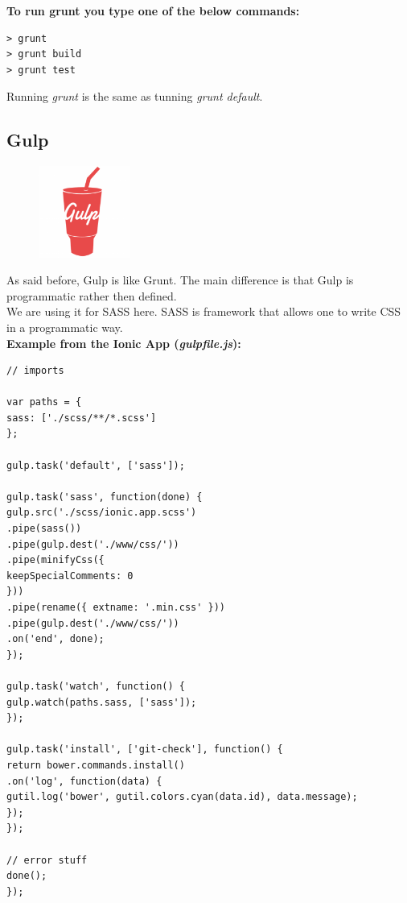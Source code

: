  \textbf{To run grunt you type one of the below commands:}
  \begin{verbatim}
> grunt
> grunt build
> grunt test
  \end{verbatim}
  Running \textit{grunt} is the same as tunning \textit{grunt default}.
 
 \subsection{Gulp}
 \begin{figure}
 	\includegraphics[width=3cm]{img/mobile-app/logos/gulp.png}
 \end{figure} 
As said before, Gulp \cite{gulp} is like Grunt.
The main difference is that Gulp is programmatic rather then defined.
\\
We are using it for SASS \cite{sass} here.
SASS is framework that allows one to write CSS in a programmatic way.
\\
\textbf{Example from the Ionic App (\textit{gulpfile.js}):}
\begin{verbatim}
// imports

var paths = {
sass: ['./scss/**/*.scss']
};

gulp.task('default', ['sass']);

gulp.task('sass', function(done) {
gulp.src('./scss/ionic.app.scss')
.pipe(sass())
.pipe(gulp.dest('./www/css/'))
.pipe(minifyCss({
keepSpecialComments: 0
}))
.pipe(rename({ extname: '.min.css' }))
.pipe(gulp.dest('./www/css/'))
.on('end', done);
});

gulp.task('watch', function() {
gulp.watch(paths.sass, ['sass']);
});

gulp.task('install', ['git-check'], function() {
return bower.commands.install()
.on('log', function(data) {
gutil.log('bower', gutil.colors.cyan(data.id), data.message);
});
});

// error stuff
done();
});
\end{verbatim}

